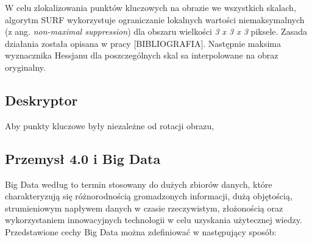 W celu zlokalizowania punktów kluczowych na obrazie we wszystkich skalach, algorytm SURF wykorzystuje ograniczanie lokalnych wartości niemaksymalnych (z ang. \textit{non-maximal suppression}) dla obszaru wielkości \textit{3 x 3 x 3} piksele. Zasada działania została opisana w pracy [BIBLIOGRAFIA]. Następnie maksima wyznacznika Hessjanu dla poszczególnych skal sa interpolowane na obraz oryginalny.

\subsection{Deskryptor} 
Aby punkty kluczowe były niezależne od rotacji obrazu, 







\subsection{Przemysł 4.0 i Big Data}

Big Data według \cite{BigDataTabakow} to termin stosowany do dużych zbiorów danych, które charakteryzują się różnorodnością gromadzonych informacji, dużą objętością, strumieniowym napływem danych w czasie rzeczywistym, złożonością oraz wykorzystaniem innowacyjnych technologii w celu uzyskania użytecznej wiedzy. Przedstawione cechy Big Data można zdefiniować w następujący sposób: 

